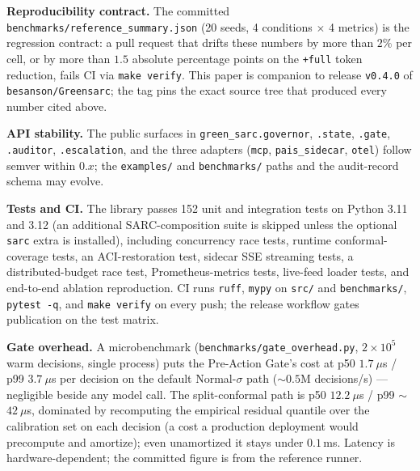 \documentclass[11pt]{article}
\theoremstyle{plain}
\theoremstyle{definition}
\theoremstyle{remark}
\begin{document}
\noindent\textbf{Reproducibility contract.} The committed \texttt{benchmarks/reference\_summary.json} (20 seeds, 4 conditions $\times$ 4 metrics) is the regression contract: a pull request that drifts these numbers by more than $2\%$ per cell, or by more than $1.5$ absolute percentage points on the \texttt{+full} token reduction, fails CI via \texttt{make verify}. This paper is companion to release \texttt{v0.4.0} of \texttt{besanson/Greensarc}; the tag pins the exact source tree that produced every number cited above.

\noindent\textbf{API stability.} The public surfaces in \texttt{green\_sarc.governor}, \texttt{.state}, \texttt{.gate}, \texttt{.auditor}, \texttt{.escalation}, and the three adapters (\texttt{mcp}, \texttt{pais\_sidecar}, \texttt{otel}) follow semver within $0.x$; the \texttt{examples/} and \texttt{benchmarks/} paths and the audit-record schema may evolve.

\noindent\textbf{Tests and CI.} The library passes 152 unit and integration tests on Python 3.11 and 3.12 (an additional SARC-composition suite is skipped unless the optional \texttt{sarc} extra is installed), including concurrency race tests, runtime conformal-coverage tests, an ACI-restoration test, sidecar SSE streaming tests, a distributed-budget race test, Prometheus-metrics tests, live-feed loader tests, and end-to-end ablation reproduction. CI runs \texttt{ruff}, \texttt{mypy} on \texttt{src/} and \texttt{benchmarks/}, \texttt{pytest -q}, and \texttt{make verify} on every push; the release workflow gates publication on the test matrix.

\noindent\textbf{Gate overhead.} A microbenchmark (\texttt{benchmarks/gate\_overhead.py}, $2{\times}10^5$ warm decisions, single process) puts the Pre-Action Gate's cost at p50 $1.7~\mu$s / p99 $3.7~\mu$s per decision on the default Normal-$\sigma$ path ($\sim$$0.5$M decisions/s) --- negligible beside any model call. The split-conformal path is p50 $12.2~\mu$s / p99 $\sim$$42~\mu$s, dominated by recomputing the empirical residual quantile over the calibration set on each decision (a cost a production deployment would precompute and amortize); even unamortized it stays under $0.1$\,ms. Latency is hardware-dependent; the committed figure is from the reference runner.
\end{document}
